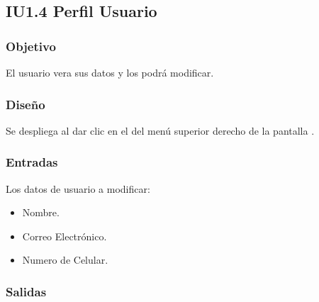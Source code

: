 \newpage
\subsection{IU1.4 Perfil Usuario}

\subsubsection{Objetivo}
	El usuario vera sus datos y los podrá modificar.

\subsubsection{Diseño}
	Se despliega al dar clic en el  del menú superior derecho de la pantalla .


\subsubsection{Entradas}
Los datos de usuario a modificar:
\begin{itemize}
	\item Nombre.
	\item Correo Electrónico.
	\item Numero de Celular.
\end{itemize}

\subsubsection{Salidas}
\begin{Citemize}
	\item {}
	\item {}
	\item {}
	\item {}
	\item {}
\end{Citemize}